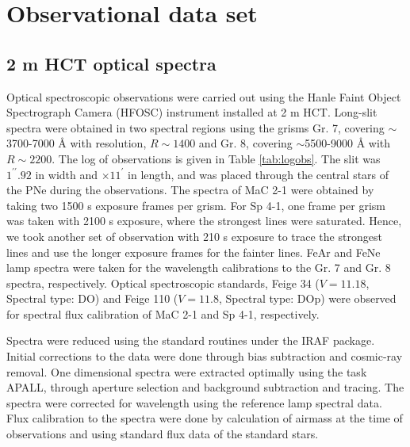\documentclass[a4paper,fleqn,usenatbib]{mnras}
\begin{document}
\section{Observational data set} \label{sec:obsdataset}

\subsection{2 m HCT optical spectra} \label{sec:hctspec}
Optical spectroscopic observations were carried out using the Hanle Faint Object Spectrograph Camera (HFOSC) instrument installed at 2 m HCT. Long-slit spectra were obtained in two spectral regions using the grisms Gr. 7, covering $\sim$3700-7000 {\AA} with resolution, $R\sim1400$ and Gr. 8, covering $\sim$5500-9000 {\AA} with $R\sim2200$. The log of observations is given in Table \ref{tab:logobs}. The slit was $1^{\prime\prime}.92$ in width and $\times 11^{\prime}$ in length, and was placed through the central stars of the PNe during the observations. The spectra of MaC 2-1 were obtained by taking two 1500 s exposure frames per grism. For Sp 4-1, one frame per grism was taken with 2100 s exposure, where the strongest lines were saturated. Hence, we took another set of observation with 210 s exposure to trace the strongest lines and use the longer exposure frames for the fainter lines. FeAr and FeNe lamp spectra were taken for the wavelength calibrations to the Gr. 7 and Gr. 8 spectra, respectively. Optical spectroscopic standards, Feige 34 ($V=11.18$, Spectral type: DO) and Feige 110 ($V=11.8$, Spectral type: DOp) were observed for spectral flux calibration of MaC 2-1 and Sp 4-1, respectively.

Spectra were reduced using the standard routines under the IRAF package. Initial corrections to the data were done through bias subtraction and cosmic-ray removal. One dimensional spectra were extracted optimally using the task APALL, through aperture selection and background subtraction and tracing. The spectra were corrected for wavelength using the reference lamp spectral data. Flux calibration to the spectra were done by calculation of airmass at the time of observations and using standard flux data of the standard stars.  
\end{document}
